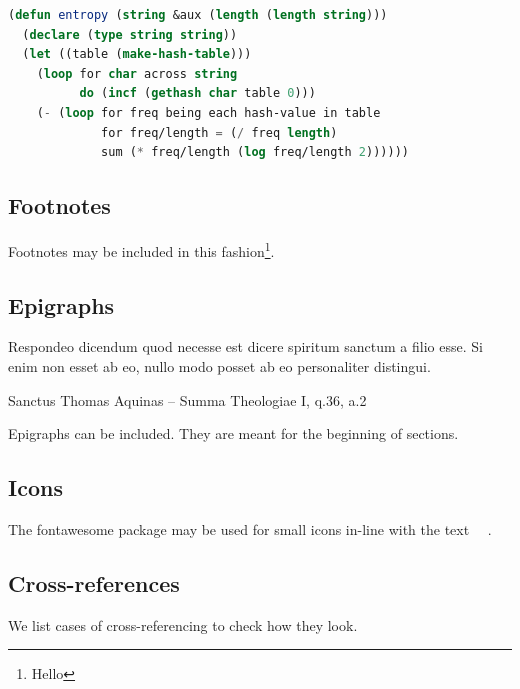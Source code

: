 \begin{lstlisting}[language=Lisp,
                   caption={Common Lisp code sample
                            \cite{common-lisp-example}.},
                   label={lst:common-lisp}]
(defun entropy (string &aux (length (length string)))
  (declare (type string string))
  (let ((table (make-hash-table)))
    (loop for char across string
          do (incf (gethash char table 0)))
    (- (loop for freq being each hash-value in table
             for freq/length = (/ freq length)
             sum (* freq/length (log freq/length 2))))))
\end{lstlisting}

\subsection{Footnotes}
Footnotes may be included in this fashion\footnote{Hello}.

\subsection{Epigraphs}
\epigraph{Respondeo dicendum quod necesse est dicere spiritum sanctum a filio
esse. Si enim non esset ab eo, nullo modo posset ab eo personaliter distingui.}
{Sanctus Thomas Aquinas -- Summa Theologiae I, q.36, a.2}

Epigraphs can be included. They are meant for the beginning of sections.

\subsection{Icons}
The fontawesome package \cite{fontawesome-latex} may be used for small icons
in-line with the text \faSmileO~\faMedkit~\faBicycle.

\subsection{Cross-references}
We list cases of cross-referencing to check how they look.

